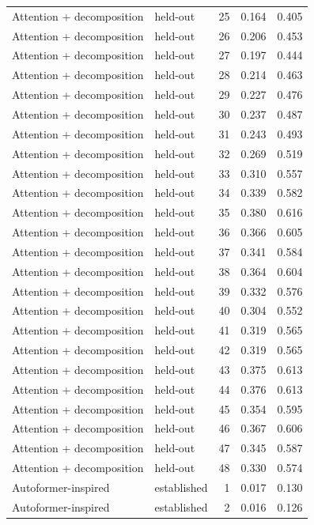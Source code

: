 \begin{tabular}{llrrr}
Attention + decomposition & held-out & 25 & 0.164 & 0.405 \\
Attention + decomposition & held-out & 26 & 0.206 & 0.453 \\
Attention + decomposition & held-out & 27 & 0.197 & 0.444 \\
Attention + decomposition & held-out & 28 & 0.214 & 0.463 \\
Attention + decomposition & held-out & 29 & 0.227 & 0.476 \\
Attention + decomposition & held-out & 30 & 0.237 & 0.487 \\
Attention + decomposition & held-out & 31 & 0.243 & 0.493 \\
Attention + decomposition & held-out & 32 & 0.269 & 0.519 \\
Attention + decomposition & held-out & 33 & 0.310 & 0.557 \\
Attention + decomposition & held-out & 34 & 0.339 & 0.582 \\
Attention + decomposition & held-out & 35 & 0.380 & 0.616 \\
Attention + decomposition & held-out & 36 & 0.366 & 0.605 \\
Attention + decomposition & held-out & 37 & 0.341 & 0.584 \\
Attention + decomposition & held-out & 38 & 0.364 & 0.604 \\
Attention + decomposition & held-out & 39 & 0.332 & 0.576 \\
Attention + decomposition & held-out & 40 & 0.304 & 0.552 \\
Attention + decomposition & held-out & 41 & 0.319 & 0.565 \\
Attention + decomposition & held-out & 42 & 0.319 & 0.565 \\
Attention + decomposition & held-out & 43 & 0.375 & 0.613 \\
Attention + decomposition & held-out & 44 & 0.376 & 0.613 \\
Attention + decomposition & held-out & 45 & 0.354 & 0.595 \\
Attention + decomposition & held-out & 46 & 0.367 & 0.606 \\
Attention + decomposition & held-out & 47 & 0.345 & 0.587 \\
Attention + decomposition & held-out & 48 & 0.330 & 0.574 \\
Autoformer-inspired & established & 1 & 0.017 & 0.130 \\
Autoformer-inspired & established & 2 & 0.016 & 0.126 \\

\end{tabular}
